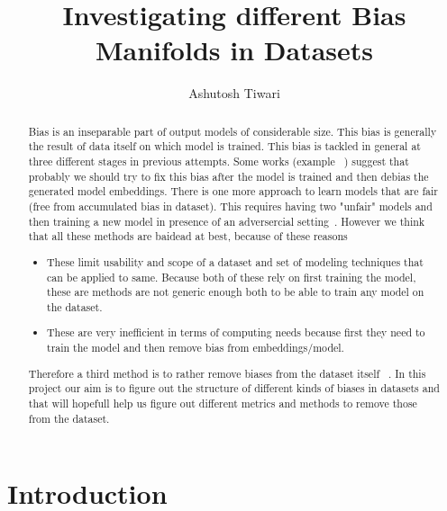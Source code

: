 \documentclass[sigconf,authordraft]{acmart}
\begin{document}
\title{Investigating different Bias Manifolds in Datasets}
\author{Ashutosh Tiwari}
\begin{abstract}

Bias is an inseparable part of output models of considerable size. This bias is generally the result of data itself on which model is trained. This bias is tackled in general at three different stages in previous attempts. Some works (example ~\cite{DBLP:journals/corr/BolukbasiCZSK16a}) suggest that probably we should try to fix this bias after the model is trained and then debias the generated model embeddings. There is one more approach to learn models  that are fair (free from accumulated bias in dataset). This requires having two "unfair" models and then training a new model in presence of an adversercial setting~\cite{kenna_using_2021}. However we think that all these methods are baidead at best, because of these reasons \begin{itemize}
    \item These limit usability and scope of a dataset and set of modeling techniques that can be applied to same. Because both of these rely on first training the model, these are methods are not generic enough both to be able to train any model on the dataset.
    \item These are very inefficient in terms of computing needs because first they need to train the model and then remove bias from embeddings/model. 
    
\end{itemize} 

Therefore a third method is to rather remove biases from the dataset itself ~\cite{ravfogel_null_2020}. In this project our aim is to figure out the structure of different kinds of biases in datasets and that will hopefull help us figure out different metrics and methods to remove those from the dataset.

\end{abstract}

\maketitle

\section{Introduction}
\end{document}
